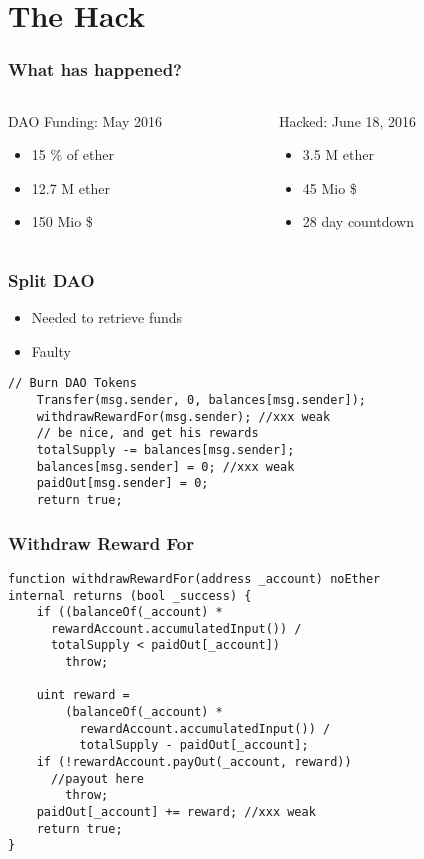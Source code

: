 \documentclass{beamer}
\begin{document}
\section{The Hack}


\begin{frame}[fragile]
  \frametitle{What has happened?}
  \begin{columns}
    \begin{column}{0.5\textwidth}
      DAO Funding: May 2016
      \begin{itemize}
        \item 15 \% of ether
        \item 12.7 M ether
        \item 150 Mio \$
      \end{itemize}
    \end{column}
    \pause
    \begin{column}{0.5\textwidth}
      Hacked: June 18, 2016
      \begin{itemize}
        \item 3.5 M ether
        \item 45 Mio \$
        \item 28 day countdown
      \end{itemize}
    \end{column}
  \end{columns}
\end{frame}

\begin{frame}[fragile]
  \frametitle{Split DAO}
  \begin{itemize}
    \item Needed to retrieve funds
    \item Faulty
  \end{itemize}
  \begin{lstlisting}[language=Solidity]
    // Burn DAO Tokens
    Transfer(msg.sender, 0, balances[msg.sender]);
    withdrawRewardFor(msg.sender); //xxx weak
    // be nice, and get his rewards
    totalSupply -= balances[msg.sender];
    balances[msg.sender] = 0; //xxx weak
    paidOut[msg.sender] = 0;
    return true;
  \end{lstlisting}
\end{frame}

\begin{frame}[fragile]
  \frametitle{Withdraw Reward For}
  \begin{lstlisting}[language=Solidity]
function withdrawRewardFor(address _account) noEther 
internal returns (bool _success) {
    if ((balanceOf(_account) * 
      rewardAccount.accumulatedInput()) /
      totalSupply < paidOut[_account])
        throw;

    uint reward =
        (balanceOf(_account) * 
          rewardAccount.accumulatedInput()) /
          totalSupply - paidOut[_account];
    if (!rewardAccount.payOut(_account, reward)) 
      //payout here
        throw;
    paidOut[_account] += reward; //xxx weak
    return true;
}
  \end{lstlisting}
\end{frame}
\end{document}
